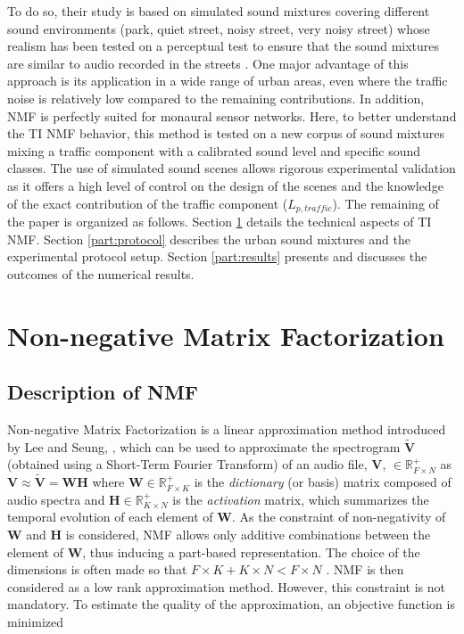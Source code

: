 \documentclass[12pt,english,twoside]{article}
\begin{document}
To do so, their study is based on simulated sound mixtures covering different sound environments (park, quiet street, noisy street, very noisy street) whose realism has been tested on a perceptual test to ensure that the sound mixtures are similar to audio recorded in the streets \cite{gloaguen2017creation}. 
One major advantage of this approach is its application in a wide range of urban areas, even where the traffic noise is relatively low compared to the remaining contributions. In addition, NMF is perfectly suited for monaural sensor networks. 
Here, to better understand the TI NMF behavior, this method is tested on a new corpus of sound mixtures mixing a traffic component with a calibrated sound level and specific sound classes. The use of simulated sound scenes allows rigorous experimental validation as it offers a high level of control on the design of the scenes and the knowledge of the exact contribution of the traffic component ($L_{p,traffic}$).
The remaining of the paper is organized as follows. Section \ref{part:nmf} details the technical aspects of TI NMF. Section \ref{part:protocol} describes the urban sound mixtures and the experimental protocol setup. Section \ref{part:results} presents and discusses the outcomes of the numerical results.

\section{Non-negative Matrix Factorization}\label{part:nmf}
\subsection{Description of NMF}

Non-negative Matrix Factorization is a linear approximation method introduced by Lee and Seung, \cite{lee_learning_1999}, which can be used to approximate the spectrogram $\mathbf{\tilde{V}}$ (obtained using a Short-Term Fourier Transform) of an audio file, $\mathbf{V}$, $\in \mathbb{R}^+_{F \times N}$ as $\mathbf{V} \approx \mathbf{\tilde{V}} = \mathbf{WH}$
where $\mathbf{W} \in \mathbb{R}^+_{F \times K}$ is the \textit{dictionary} (or basis) matrix composed of audio spectra and $\mathbf{H} \in \mathbb{R}^+_{K \times N}$ is the \textit{activation} matrix, which summarizes the temporal evolution of each element of $\mathbf{W}$. As the constraint of non-negativity of $\mathbf{W}$ and $\mathbf{H}$ is considered, NMF allows only additive combinations between the element of $\mathbf{W}$, thus inducing a part-based representation.
The choice of the dimensions is often made so that $F\times K + K \times N < F \times N$ \cite{fevotte_nonnegative_2009}. NMF is then considered as a low rank approximation method. However, this constraint is not mandatory. To estimate the quality of the approximation, an objective function is minimized
\end{document}

